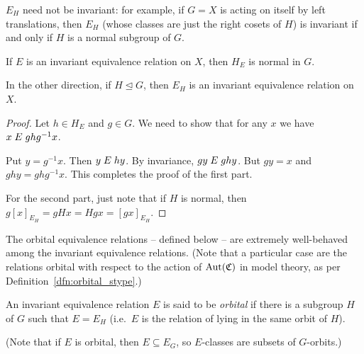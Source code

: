 	\begin{ex}
		$E_H$ need not be invariant: for example, if $G=X$ is acting on itself by left translations, then $E_H$ (whose classes are just the right cosets of $H$) is invariant if and only if $H$ is a normal subgroup of $G$.\xqed{\lozenge}
	\end{ex}
	
	\begin{prop}
		\label{prop:orb_norm}
		If $E$ is an invariant equivalence relation on $X$, then $H_E$ is normal in $G$.
		
		In the other direction, if $H\unlhd G$, then $E_H$ is an invariant equivalence relation on $X$.
	\end{prop}
	\begin{proof}
		Let $h\in H_E$ and $g\in G$. We need to show that for any $x$ we have $x \mathrel{E} ghg^{-1}x$.
		
		Put $y=g^{-1}x$. Then $y\mathrel{E} hy$. By invariance, $gy\mathrel{E} ghy$. But $gy=x$ and $ghy=ghg^{-1}x$. This completes the proof of the first part.
		
		For the second part, just note that if $H$ is normal, then $g[x]_{E_H}=gHx=Hgx=[gx]_{E_H}$.
	\end{proof}
	
	The orbital equivalence relations -- defined below -- are extremely well-behaved among the invariant equivalence relations. (Note that a particular case are the relations orbital with respect to the action of $\operatorname{{Aut}}({\mathfrak C})$ in model theory, as per Definition~\ref{dfn:orbital_stype}.)
	
	\begin{dfn}
		An invariant equivalence relation $E$ is said to be \emph{orbital} if there is a subgroup $H$ of $G$ such that $E=E_H$ (i.e.\ $E$ is the relation of lying in the same orbit of $H$).\xqed{\lozenge}
	\end{dfn}
	
	(Note that if $E$ is orbital, then $E\subseteq E_G$, so $E$-classes are subsets of $G$-orbits.)
	
